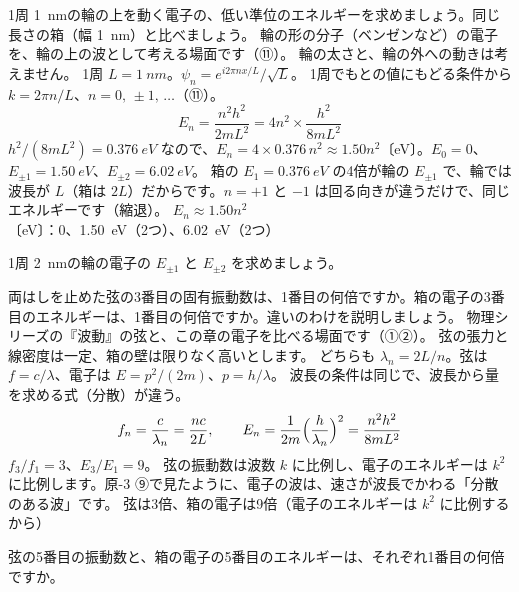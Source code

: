 \label{ph:原-5:ex10}
\begin{phreidai}[輪の上の電子]
1周 \qty{1}{nm}の輪の上を動く電子の、低い準位のエネルギーを求めましょう。同じ長さの箱（幅 \qty{1}{nm}）と比べましょう。
\phbamen
輪の形の分子（ベンゼンなど）の電子を、輪の上の波として考える場面です（⑪）。
\phmushi
輪の太さと、輪の外への動きは考えません。
\phzu
1周 $L=\qty{1}{nm}$。$\psi_n=e^{i2\pi nx/L}/\sqrt L$。
\phriyu
1周でもとの値にもどる条件から $k=2\pi n/L$、$n=0,\,\pm1,\,\ldots$（⑪）。
\phtateru
\[E_n=\frac{n^2h^2}{2mL^2}=4n^2\times\frac{h^2}{8mL^2}\]
\phtoku
$h^2/(8mL^2)=\qty{0.376}{eV}$ なので、$E_n=4\times0.376\,n^2\approx1.50n^2$〔eV〕。$E_0=0$、$E_{\pm1}=\qty{1.50}{eV}$、$E_{\pm2}=\qty{6.02}{eV}$。
\phtashikame
箱の $E_1=\qty{0.376}{eV}$ の4倍が輪の $E_{\pm1}$ で、輪では波長が $L$（箱は $2L$）だからです。$n=+1$ と $-1$ は回る向きが違うだけで、同じエネルギーです（縮退）。
\kotae $E_n\approx1.50n^2$〔eV〕：0、\qty{1.50}{eV}（2つ）、\qty{6.02}{eV}（2つ）
\end{phreidai}
\begin{jibun}
1周 \qty{2}{nm}の輪の電子の $E_{\pm1}$ と $E_{\pm2}$ を求めましょう。
\end{jibun}

\label{ph:原-5:ex11}
\begin{phreidai}
両はしを止めた弦の3番目の固有振動数は、1番目の何倍ですか。箱の電子の3番目のエネルギーは、1番目の何倍ですか。違いのわけを説明しましょう。
\phbamen
物理シリーズの『波動』の弦と、この章の電子を比べる場面です（①②）。
\phmushi
弦の張力と線密度は一定、箱の壁は限りなく高いとします。
\phzu
どちらも $\lambda_n=2L/n$。弦は $f=c/\lambda$、電子は $E=p^2/(2m)$、$p=h/\lambda$。
\phriyu
波長の条件は同じで、波長から量を求める式（分散）が違う。
\phtateru
\[f_n=\frac{c}{\lambda_n}=\frac{nc}{2L},\qquad E_n=\frac{1}{2m}\Bigl(\frac{h}{\lambda_n}\Bigr)^2=\frac{n^2h^2}{8mL^2}\]
\phtoku
$f_3/f_1=3$、$E_3/E_1=9$。
\phtashikame
弦の振動数は波数 $k$ に比例し、電子のエネルギーは $k^2$ に比例します。原-3 ⑨で見たように、電子の波は、速さが波長でかわる「分散のある波」です。
\kotae 弦は3倍、箱の電子は9倍（電子のエネルギーは $k^2$ に比例するから）
\end{phreidai}
\begin{jibun}
弦の5番目の振動数と、箱の電子の5番目のエネルギーは、それぞれ1番目の何倍ですか。
\end{jibun}

